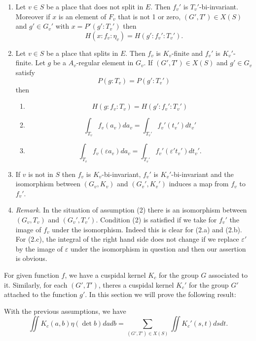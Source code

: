\begin{enumerate}
    \item Let $v\in S$ be a place that does not split in $E$.
    Then $f_v'$ is $T_v'$-bi-invariant.
    Moreover if $x$ is an element of $F_v$ that is not 1 or zero, $(G', T') \in X(S)$ and $g' \in G_v'$ with $x = P'(g': T_v')$ then
    \begin{equation*}
        H(x:f_v:\eta_v) = H(g':f_v':T_v').
    \end{equation*}
    \item Let $v \in S$ be a place that splits in $E$.
    Then $f_v$ is $K_v$-finite and $f_v'$ is $K_v'$-finite.
    Let $g$ be a $A_v$-regular element in $G_v$.
    If $(G', T') \in X(S)$ and $g' \in G_v$ satisfy
    \begin{equation*}
        P(g:T_v) = P(g':T_v')
    \end{equation*}
    then
    \begin{enumerate}
        \item \begin{equation*}
            H(g:f_v:T_v) = H(g':f_v':T_v')
        \end{equation*}
        \item \begin{equation*}
            \int_{T_v} f_v(a_v) da_v = \int_{T_v'} f_v'(t_v') dt_v'
        \end{equation*}
        \item \begin{equation*}
            \int_{T_v} f_v(\varepsilon a_v) da_v = \int_{T_v'} f_v'(\varepsilon't_v') dt_v'.
        \end{equation*}
    \end{enumerate}
    \item If $v$ is not in $S$ then $f_v$ is $K_v$-bi-invariant, $f_v'$ is $K_v'$-bi-invariant and the isomorphism between $(G_v, K_v)$ and $(G_v', K_v')$ induces a map from $f_v$ to $f_v'$.
    \item \emph{Remark}. In the situation of assumption (2) there is an isomorphism between $(G_v, T_v)$ and $(G_v', T_v')$.
    Condition (2) is satisfied if we take for $f_v'$ the image of $f_v$ under the isomorphism.
    Indeed this is clear for (2.a) and (2.b).
    For (2.c), the integral of the right hand side does not change if we replace $\varepsilon'$ by the image of $\varepsilon$ under the isomorphism in question and then our assertion is obvious.
\end{enumerate}

For given function $f$, we have a cuspidal kernel $K_c$ for the group $G$ associated to it.
Similarly, for each $(G', T')$, theres a cuspidal kernel $K_c'$ for the group $G'$ attached to the function $g'$.
In this section we will prove the following result:
\begin{theorem}
With the previous assumptions, we have
\begin{equation}
    \iint K_c(a, b) \eta(\det b) dadb = \sum_{(G', T') \in X(S)} \iint K_{c}'(s, t)dsdt.
\end{equation}
\end{theorem}


